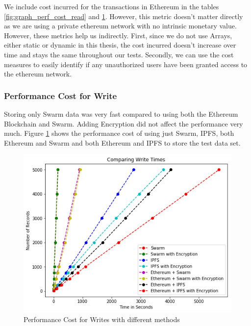 \documentclass[11pt,openright]{report}
\begin{document}
We include cost incurred for the transactions in Ethereum in the tables \ref{fig:graph_perf_cost_read} and \ref{fig:graph_perf_cost_write}. However, this metric doesn't matter directly as we are using a private ethereum network with no intrinsic monetary value. However, these metrics help us indirectly. First, since we do not use Arrays, either static or dynamic in this thesis, the cost incurred doesn't increase over time and stays the same throughout our tests. Secondly, we can use the cost measures to easily identify if any unauthorized users have been granted access to the ethereum network.

\subsubsection{Performance Cost for Write}
Storing only Swarm data was very fast compared to using both the Ethereum Blockchain and Swarm. Adding Encryption did not affect the performance very much. Figure \ref{fig:graph_perf_cost_write} shows the performance cost of using just Swarm, IPFS, both Ethereum and Swarm and both Ethereum and IPFS to store the test data set.

\begin{figure}
    \centering
    \includegraphics[scale=0.8]{results/graphs/WriteComp.png}
    \caption{Performance Cost for Writes with different methods}
    \label{fig:graph_perf_cost_write}
\end{figure}
\end{document}
